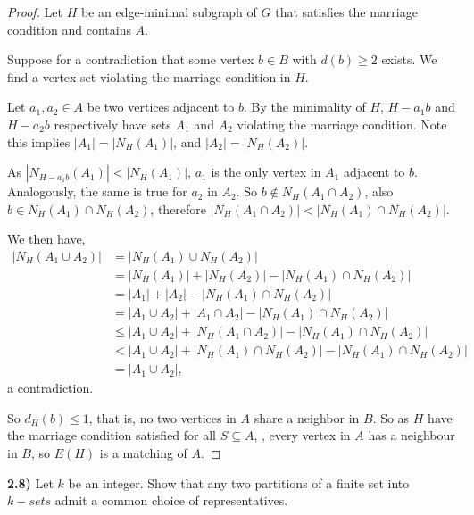 \documentclass[11pt]{article}
\theoremstyle{plain}
\begin{document}
\begin{proof}
Let $H$ be an edge-minimal subgraph of $G$ that satisfies the marriage condition and contains $A$.

Suppose for a contradiction that some vertex $b \in B$ with $d(b) \geq 2$ exists. We find a vertex set violating the marriage condition in $H$.

Let $a_1,a_2 \in A$ be two vertices adjacent to $b$. By the minimality of $H$, $H-a_1b$ and $H-a_2b$ respectively have sets $A_1$ and $A_2$ violating the marriage condition. Note this implies $|A_1| = |N_H(A_1)|$, and $|A_2| = |N_H(A_2)|$.

As $|N_{H-a_1b}(A_1)| < |N_{H}(A_1)|$, $a_1$ is the only vertex in $A_1$ adjacent to $b$. Analogously, the same is true for $a_2$ in $A_2$. So $b \not \in N_H(A_1 \cap A_2)$, also $b \in N_H(A_1) \cap N_H(A_2) $, therefore $|N_H(A_1 \cap A_2)| < | N_H(A_1) \cap N_H(A_2)|$.

We then have,
\begin{align*}
|N_H(A_1 \cup A_2)| &= |N_H(A_1) \cup N_H(A_2)| \\
& = |N_H(A_1)| + |N_H(A_2)| - |N_H(A_1) \cap N_H(A_2)| \\
& = |A_1| + |A_2| - |N_H(A_1) \cap N_H(A_2)| \\
& = |A_1 \cup A_2| + |A_1 \cap A_2| - |N_H(A_1) \cap N_H(A_2)| \\
& \leq |A_1 \cup A_2| + |N_H(A_1 \cap A_2)| - |N_H(A_1) \cap N_H(A_2)| \\
& < |A_1 \cup A_2| + | N_H(A_1) \cap N_H(A_2)| - |N_H(A_1) \cap N_H(A_2)| \\
& = |A_1 \cup A_2|,
\end{align*}
a contradiction.

So $d_H(b) \leq 1$, that is, no two vertices in $A$ share a neighbor in $B$. So as $H$ have the marriage condition satisfied for all $S \subseteq A$, , every vertex in $A$ has a neighbour in $B$, so $E(H)$ is a matching of $A$.
\end{proof}


\textbf{2.8)} Let $k$ be an integer. Show that any two partitions of a finite set into $k-sets$ admit a common choice of representatives.
\end{document}
